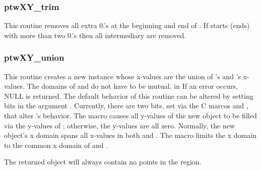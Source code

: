 \subsubsection{ptwXY\_trim}
This routine removes all extra 0.'s at the beginning and end of .
If  starts (ends) with more than two 0.'s then all intermediary are removed.

\subsubsection{ptwXY\_union}
This routine creates a new  instance whose x-values are the union of 's and 's 
x-values. The domains of  and  do not have to be mutual.
     in \noindent
If an error occurs, NULL is returned. The default behavior of this routine can be altered by setting bits
in the argument  . Currently, there are two bits, set via the C marcos
 and ,
that alter 's behavior. The macro  causes all y-values of the new  object
to be filled via the y-values of ; otherwise, the y-values are all zero. 
Normally, the new  object's x domain spans all x-values
in both  and . The macro  limits the x domain to the common x domain
of  and .

The returned  object will always contain no points in the  region.
